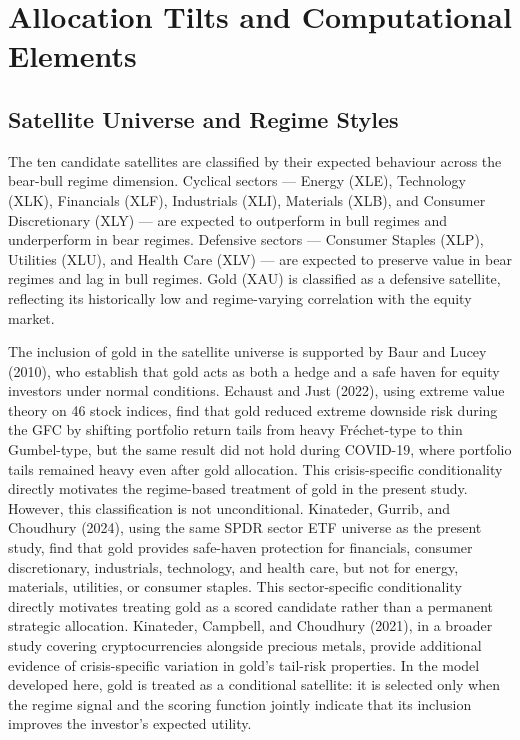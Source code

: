 \documentclass[12pt, a4paper]{article}
\begin{document}
\clearpage
\clearpage
\section{Allocation Tilts and Computational Elements}
\label{sec:tilts}

\subsection{Satellite Universe and Regime Styles}

The ten candidate satellites are classified by their expected behaviour across the
bear-bull regime dimension. Cyclical sectors --- Energy (XLE), Technology (XLK), Financials
(XLF), Industrials (XLI), Materials (XLB), and Consumer Discretionary (XLY) --- are expected
to outperform in bull regimes and underperform in bear regimes. Defensive sectors --- Consumer
Staples (XLP), Utilities (XLU), and Health Care (XLV) --- are expected to preserve value in
bear regimes and lag in bull regimes. Gold (XAU) is classified as a defensive satellite,
reflecting its historically low and regime-varying correlation with the equity market.

The inclusion of gold in the satellite universe is supported by Baur and Lucey (2010), who
establish that gold acts as both a hedge and a safe haven for equity investors under normal
conditions. Echaust and Just (2022), using extreme value theory on 46 stock indices, find
that gold reduced extreme downside risk during the GFC by shifting portfolio return tails
from heavy Fr\'echet-type to thin Gumbel-type, but the same result did not hold during
COVID-19, where portfolio tails remained heavy even after gold allocation. This
crisis-specific conditionality directly motivates the regime-based treatment of gold in the
present study. However, this classification is not unconditional. Kinateder, Gurrib, and
Choudhury (2024), using the same SPDR sector ETF universe as the present study, find that
gold provides safe-haven protection for financials, consumer discretionary, industrials,
technology, and health care, but not for energy, materials, utilities, or consumer staples.
This sector-specific conditionality directly motivates treating gold as a scored candidate
rather than a permanent strategic allocation. Kinateder, Campbell, and Choudhury (2021),
in a broader study covering cryptocurrencies alongside precious metals, provide additional
evidence of crisis-specific variation in gold's tail-risk properties. In the model developed
here, gold is treated as a conditional satellite: it is selected only when the regime signal
and the scoring function jointly indicate that its inclusion improves the investor's expected
utility.
\end{document}
